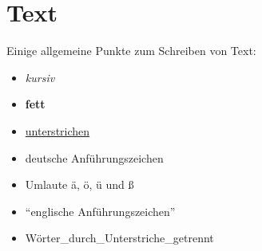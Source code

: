 \chapter{Text}

Einige allgemeine Punkte zum Schreiben von Text:

\begin{itemize}
 \item\textit{kursiv}
 \item \textbf{fett}
 \item \uline{unterstrichen}
 \item \glqq{}deutsche Anführungszeichen\grqq{}
 \item Umlaute ä, ö, ü und ß
 \item ``englische Anführungszeichen''
 \item Wörter\_durch\_Unterstriche\_getrennt
\end{itemize}